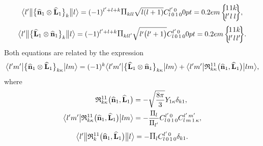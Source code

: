 \begin{equation*}
\braOketred{ l^{\prime}}{\bigl\{\widehat{\vect{n}}_{1} \otimes \widehat{\vect{L}}_{1}\bigr\}_{k}}{ l}=(-1)^{l^{\prime}+l+k} \Fact{k l l}\sqrt{ l(l+1)}
\clebsch{l}{0}{1}{0}{l^{\prime}}{0}
\sixj{1}{1}{k}{l^{\prime}}{l}{l},
\end{equation*}
\begin{equation*}
\braOketred{ l^{\prime}}{\bigl\{\widehat{\vect{L}}_{1} \otimes \widehat{\vect{n}}_{1}\bigr\}_{k}}{ l}=(-1)^{l^{\prime}+l+k} \Fact{k l l^{\prime}}\sqrt{ l^{\prime}\bigl(l^{\prime}+1\bigr)}
\clebsch{l}{0}{1}{0}{l^{\prime}}{0}
\sixj{1}{1}{k}{l^{\prime}}{l}{l^{\prime}} .
\end{equation*}
Both equations are related by the expression
\begin{equation}
\bigl\langle  l^{\prime} m^{\prime} \big| \bigl\{\widehat{\mathbf{n}}_{1} \otimes \widehat{\mathbf{L}}_{1}\bigr\}_{k \kappa} \big| l m \bigr\rangle=(-1)^{k}
\bigl\langle  l^{\prime} m^{\prime} \big| \bigl\{\widehat{\mathbf{L}}_{1} \otimes \widehat{\mathbf{n}}_{1}\bigr\}_{k \kappa} \big| l m \bigr\rangle+
\bigl\langle  l^{\prime} m^{\prime} \big|  \mathfrak{R}_{k \kappa}^{11}\bigl(\widehat{\mathbf{n}}_{1}, \widehat{\mathbf{L}}_{1}\bigr) \big| l m \bigr\rangle, \label{eq:13:2:75}
\end{equation}
where
\begin{align}
\mathfrak{R}_{k \kappa}^{11}\bigl(\widehat{\vect{n}}_{1}, \widehat{\vect{L}}_{1}\bigr) & =-\sqrt{\frac{8 \pi}{3}} Y_{1 \kappa} \delta_{k 1},  \label{eq:13:2:76}\\
\braOket{ l^{\prime} m^{\prime}}{ \mathfrak{R}_{k \kappa}^{11}\bigl(\widehat{\vect{n}}_{1}, \widehat{\vect{L}}_{1}\bigr)}{l m} & =-\frac{\Fact{l}}{\Fact{l^{\prime}}}
\clebsch{l}{0}{1}{0}{l^{\prime}}{0} 
\clebsch{l}{m}{1}{\kappa}{l^{\prime}}{m^{\prime}}, \label{eq:13:2:77}
\end{align}
\begin{equation*}
\braOketred{ l^{\prime}}{ \mathfrak{R}_{k}^{11}\bigl(\widehat{\vect{n}}_{1}, \widehat{\vect{L}}_{1}\bigr)}{l}=-\Fact{l}
\clebsch{l}{0}{1}{0}{l^{\prime}}{0} \delta_{k 1}.
\end{equation*}



